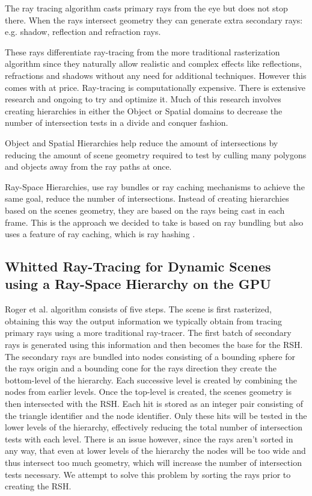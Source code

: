 \documentclass{egpubl}
\begin{document}
The ray tracing algorithm casts primary rays from the eye but does not stop there. 
When the rays intersect geometry they can generate extra secondary rays: e.g. shadow, reflection and refraction rays.

These rays differentiate ray-tracing from the more traditional rasterization algorithm since they naturally allow realistic and complex effects like reflections, refractions and shadows without any need for additional techniques. However this comes with at price. Ray-tracing is computationally expensive. There is extensive research and ongoing to try and optimize it. Much of this research involves creating hierarchies in either the Object or Spatial domains to decrease the number of intersection tests in a divide and conquer fashion.

Object and Spatial Hierarchies help reduce the amount of intersections by reducing the amount of scene geometry required to test by culling many polygons and objects away from the ray paths at once.

Ray-Space Hierarchies, use ray bundles or ray caching mechanisms to achieve the same goal, reduce the number of intersections. Instead of creating hierarchies based on the scenes geometry, they are based on the rays being cast in each frame. This is the approach we decided to take is based on ray bundling but also uses a feature of ray caching, which is ray hashing \cite{Arvo87} \cite{Aila10}.

\subsection{Whitted Ray-Tracing for Dynamic Scenes using a Ray-Space Hierarchy on the GPU}

Roger et al. \cite{Roger07} algorithm consists of five steps. The scene is first rasterized, obtaining this way the output information we typically obtain from tracing primary rays using a more traditional ray-tracer. The first batch of secondary rays is generated using this information and then becomes the base for the RSH. The secondary rays are bundled into nodes consisting of a bounding sphere for the rays origin and a bounding cone for the rays direction they create the bottom-level of the hierarchy. Each successive level is created by combining the nodes from earlier levels. Once the top-level is created, the scenes geometry is then intersected with the RSH. Each hit is stored as an integer pair consisting of the triangle identifier and the node identifier. Only these hits will be tested in the lower levels of the hierarchy, effectively reducing the total number of intersection tests with each level. There is an issue however, since the rays aren't sorted in any way, that even at lower levels of the hierarchy the nodes will be too wide and thus intersect too much geometry, which will increase the number of intersection tests necessary. We attempt to solve this problem by sorting the rays prior to creating the RSH.
\end{document}
